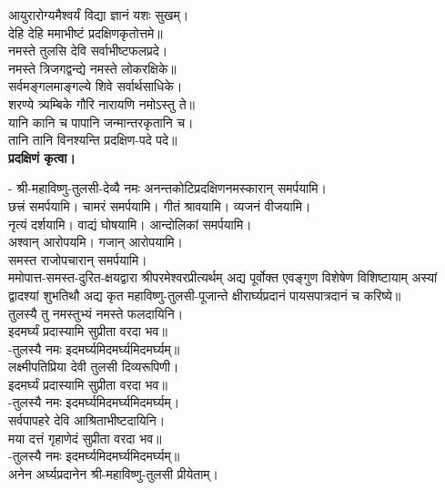 आयुरारोग्यमैश्वर्यं विद्या ज्ञानं यशः सुखम्।\\
देहि देहि ममाभीष्टं प्रदक्षिणकृतोत्तमे॥\\

नमस्ते तुलसि देवि सर्वाभीष्टफलप्रदे।\\
नमस्ते त्रिजगद्वन्द्ये नमस्ते लोकरक्षिके॥\\

सर्वमङ्गलमाङ्गल्ये शिवे सर्वार्थसाधिके।\\
शरण्ये त्र्यम्बिके गौरि नारायणि नमोऽस्तु ते॥\\

यानि कानि च पापानि जन्मान्तरकृतानि च।\\
तानि तानि विनश्यन्ति प्रदक्षिण-पदे पदे॥\\
\textbf{प्रदक्षिणं कृत्वा।}
\medskip

- श्री-महाविष्णु-तुलसी-देव्यै नमः अनन्तकोटिप्रदक्षिणनमस्कारान् समर्पयामि।\\
छत्त्रं समर्पयामि। चामरं समर्पयामि। गीतं श्रावयामि। व्यजनं वीजयामि।\\
नृत्यं दर्शयामि। वाद्यं घोषयामि। आन्दोलिकां समर्पयामि।\\
अश्वान् आरोपयमि। गजान् आरोपयामि।\\
समस्त राजोपचारान् समर्पयामि।\\


ममोपात्त-समस्त-दुरित-क्षयद्वारा श्रीपरमेश्वरप्रीत्यर्थम् अद्य पूर्वोक्त एवङ्गुण विशेषेण विशिष्टायाम् अस्यां द्वादश्यां शुभतिथौ अद्य कृत महाविष्णु-तुलसी-पूजान्ते क्षीरार्घ्यप्रदानं पायसपात्रदानं च करिष्ये॥\\

तुलस्यै तु नमस्तुभ्यं नमस्ते फलदायिनि।\\
इदमर्घ्यं प्रदास्यामि सुप्रीता वरदा भव॥\\
-तुलस्यै नमः इदमर्घ्यमिदमर्घ्यमिदमर्घ्यम्॥\\
लक्ष्मीपतिप्रिया देवी तुलसी दिव्यरूपिणी।\\
इदमर्घ्यं प्रदास्यामि सुप्रीता वरदा भव॥\\
-तुलस्यै नमः इदमर्घ्यमिदमर्घ्यमिदमर्घ्यम्।\\
सर्वपापहरे देवि आश्रिताभीष्टदायिनि।\\
मया दत्तं गृहाणेदं सुप्रीता वरदा भव॥\\
-तुलस्यै नमः इदमर्घ्यमिदमर्घ्यमिदमर्घ्यम्॥\\
अनेन अर्घ्यप्रदानेन श्री-महाविष्णु-तुलसी प्रीयेताम्।\\


